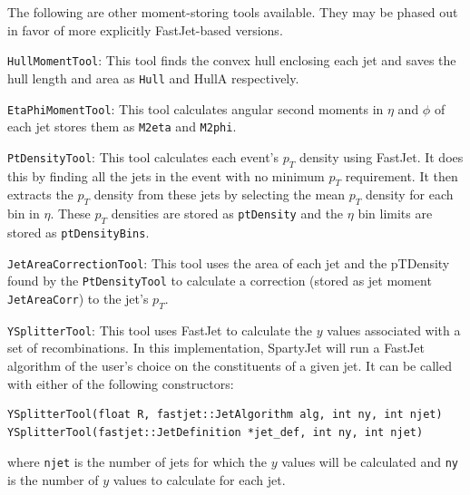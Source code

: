 \documentclass{article}
\newcommand{\prog}[1]{{\sc #1}\xspace}
\newcommand{\code}[1]{{\tt #1}\xspace}
\newcommand{\SJ}[0]{\prog{SpartyJet}}
\newcommand{\FJ}[0]{\prog{FastJet}}
\begin{document}
The following are other moment-storing tools available.  They may be phased out in favor of more explicitly \FJ-based versions.

\begin{description}
\item{\code{HullMomentTool}}:
This tool finds the convex hull enclosing each jet and saves the hull length and area as \code{Hull} and {HullA} respectively.

\item{\code{EtaPhiMomentTool}}:
This tool calculates angular second moments in $\eta$ and $\phi$ of each jet stores them as \code{M2eta} and \code{M2phi}.

\item{\code{PtDensityTool}}:
This tool calculates each event's $p_{T}$ density using \FJ.  It does this by finding all the jets in the event with no minimum $p_{T}$ requirement.  It then extracts the $p_T$ density from these jets by selecting the mean $p_T$ density for each bin in $\eta$.  These $p_T$ densities are stored as \code{ptDensity} and the $\eta$ bin limits are stored as \code{ptDensityBins}.

\item{\code{JetAreaCorrectionTool}}:
This tool uses the area of each jet and the pTDensity found by the \code{PtDensityTool} to calculate a correction (stored as jet moment \code{JetAreaCorr}) to the jet's $p_{T}$.

\item{\code{YSplitterTool}}:
\label{sec:ysplitter}
This tool uses \FJ to calculate the $y$ values associated with a set of recombinations.  In this implementation, \SJ will run a \FJ algorithm of the user's choice on the constituents of a given jet. It can be called with either of the following constructors:
\begin{lstlisting}
YSplitterTool(float R, fastjet::JetAlgorithm alg, int ny, int njet)
YSplitterTool(fastjet::JetDefinition *jet_def, int ny, int njet)
\end{lstlisting}
where \code{njet} is the number of jets for which the $y$ values will be calculated and \code{ny} is the number of $y$ values to calculate for each jet.
\end{description}
\end{document}
